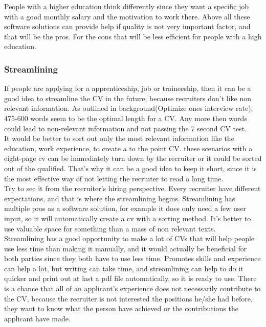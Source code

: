 People with a higher education think differently since they want a specific job
with a good monthly salary and the motivation to work there. 
Above all these software solutions can provide help if quality is not very important factor,
and that will be the pros. For the cons that will be less efficient for people with a high education.

\subsubsection{Streamlining}
If people are applying for a apprenticeship, job or traineeship, 
then it can be a good idea to streamline the CV in the future, because recruiters don't like non relevant information.
As outlined in background(Optimize ones interview rate), 475-600 words seem to be the optimal length for a CV.
Any more then words could lead to non-relevant information and not passing the 7 second CV test. \\

It would be better to sort out only the most relevant information 
like the education, work experience, to create a to the point CV. 
these scenarios with a eight-page cv can be immediately turn down by the recruiter or 
it could be sorted out of the qualified.
That's why it can be a good idea to keep it short, 
since it is the most effective way of not letting the recruiter to read a long time. \\

Try to see it from the recruiter's hiring perspective. Every recruiter have different expectations, 
and that is where the streamlining begins. Streamlining has multiple pros as a software solution,
for example it does only need a few user input, so it will automatically create a cv with a sorting method. 
It's better to use valuable space for something than a mass of non relevant texts. \\

Streamlining has a good opportunity to make a lot of CVs that will help people use less time than making it manually,
and it would actually be beneficial for both parties since they both have to use less time.
Promotes skills and experience can help a lot, but writing can take time, and streamlining can help to do it quicker 
and print out at last a pdf file automatically, so it is ready to use.
There is a chance that all of an applicant's experience does not necessarily contribute to the CV, 
because the recruiter is not interested the positions he/she had before, they want to know what the person have achieved
or the contributions the applicant have made. 

